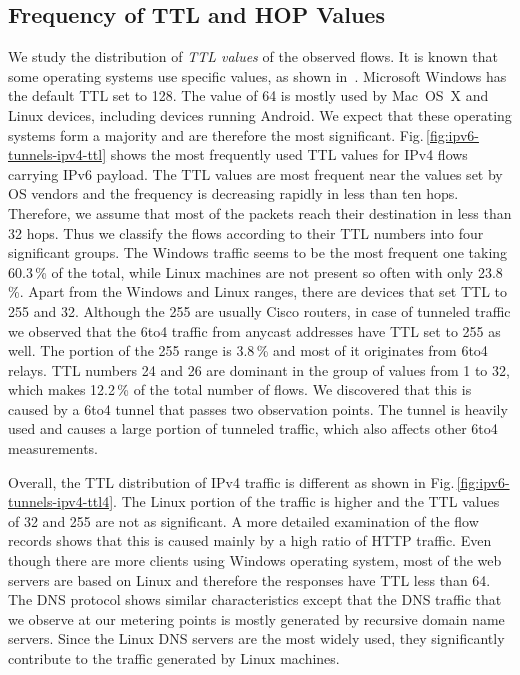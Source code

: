 \subsection{Frequency of TTL and HOP Values}
We study the distribution of \textit{TTL values} of the observed flows. It is known that some operating systems use specific values, as shown in~\cite{TTL-ref}. Microsoft Windows has the default TTL set to 128. The value of 64 is mostly used by Mac~OS~X and Linux devices, including devices running Android. We expect that these operating systems form a majority and are therefore the most significant. Fig.\,\ref{fig:ipv6-tunnels-ipv4-ttl} shows the most frequently used TTL values for IPv4 flows carrying IPv6 payload. The TTL values are most frequent near the values set by OS vendors and the frequency is decreasing rapidly in less than ten hops. Therefore, we assume that most of the packets reach their destination in less than 32 hops. Thus we classify the flows according to their TTL numbers into four significant groups. The Windows traffic seems to be the most frequent one taking 60.3\,\% of the total, while Linux machines are not present so often with only 23.8\,\%. Apart from the Windows and Linux ranges, there are devices that set TTL to 255 and 32. Although the 255 are usually Cisco routers, in case of tunneled traffic we observed that the 6to4 traffic from anycast addresses have TTL set to 255 as well. The portion of the 255 range is 3.8\,\% and most of it originates from 6to4 relays. TTL numbers 24 and 26 are dominant in the group of values from 1 to 32, which makes 12.2\,\% of the total number of flows. We discovered that this is caused by a 6to4 tunnel that passes two observation points. The tunnel is heavily used and causes a large portion of tunneled traffic, which also affects other 6to4 measurements.

Overall, the TTL distribution of IPv4 traffic is different as shown in Fig.\,\ref{fig:ipv6-tunnels-ipv4-ttl4}. The Linux portion of the traffic is higher and the TTL values of 32 and 255 are not as significant. A more detailed examination of the flow records shows that this is caused mainly by a high ratio of HTTP traffic. Even though there are more clients using Windows operating system, most of the web servers are based on Linux and therefore the responses have TTL less than 64. The DNS protocol shows similar characteristics except that the DNS traffic that we observe at our metering points is mostly generated by recursive domain name servers. Since the Linux DNS servers are the most widely used, they significantly contribute to the traffic generated by Linux machines.

